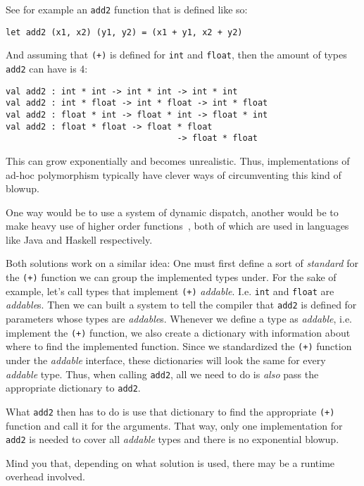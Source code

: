 See for example an \verb|add2| function that is defined like so:
\begin{verbatim}
let add2 (x1, x2) (y1, y2) = (x1 + y1, x2 + y2)
\end{verbatim}
And assuming that \verb|(+)| is defined for \verb|int| and \verb|float|, then the amount of types \verb|add2| can have is 4:
\begin{verbatim}
val add2 : int * int -> int * int -> int * int
val add2 : int * float -> int * float -> int * float
val add2 : float * int -> float * int -> float * int
val add2 : float * float -> float * float
                                  -> float * float
\end{verbatim}
This can grow exponentially and becomes unrealistic. Thus, implementations of ad-hoc polymorphism typically have clever ways of circumventing this kind of blowup.

One way would be to use a system of dynamic dispatch, another would be to make heavy use of higher order functions~\cite{type-classes-original}, both of which are used in languages like Java and Haskell respectively.

Both solutions work on a similar idea: One must first define a sort of \textit{standard} for the \verb|(+)| function we can group the implemented types under. For the sake of example, let's call types that implement \verb|(+)| \textit{addable}. I.e. \verb|int| and \verb|float| are \textit{addable}s. Then we can built a system to tell the compiler that \verb|add2| is defined for parameters whose types are \textit{addable}s. Whenever we define a type as \textit{addable}, i.e. implement the \verb|(+)| function, we also create a dictionary with information about where to find the implemented function. Since we standardized the \verb|(+)| function under the \textit{addable} interface, these dictionaries will look the same for every \textit{addable} type. Thus, when calling \verb|add2|, all we need to do is \textit{also} pass the appropriate dictionary to \verb|add2|.

What \verb|add2| then has to do is use that dictionary to find the appropriate \verb|(+)| function and call it for the arguments. That way, only one implementation for \verb|add2| is needed to cover all \textit{addable} types and there is no exponential blowup.

Mind you that, depending on what solution is used, there may be a runtime overhead involved.
